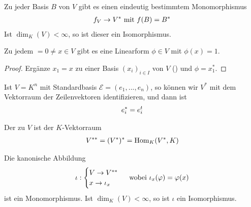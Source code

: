 \begin{conclusion}
	Zu jeder Basis $B$ von $V$ gibt es einen eindeutig bestimmtem Monomorphismus
	\begin{align}
		f_V\to V^*\text{ mit } f(B)=B^*\notag
	\end{align}
	Ist $\dim_K(V)<\infty$, so ist dieser ein Isomorphismus.
\end{conclusion}

\begin{conclusion}
	Zu jedem $=0\neq x\in V$ gibt es eine Linearform $\phi\in V$ mit $\phi(x)=1$.
\end{conclusion}
\begin{proof}
	Ergänze $x_1=x$ zu einer Basis $(x_i)_{i\in I}$ von $V$ () und $\phi=x_1^*$.
\end{proof}

\begin{example}
	Ist $V=K^n$ mit Standardbasis $\mathcal{E}=(e_1,...,e_n)$, so können wir $V^*$ mit dem Vektorraum der Zeilenvektoren identifizieren, und dann ist
	\begin{align}
		e_i^* = e_i^t\notag
	\end{align}
\end{example}

\begin{definition}[Bidualraum]
	Der  zu $V$ ist der $K$-Vektorraum
	\begin{align}
		V^{**}=(V^*)^*=\Hom_K(V^*,K)\notag
	\end{align}
\end{definition}

\begin{proposition}
	Die kanonische Abbildung
	\begin{align}
		\iota:\begin{cases}
		V\to V^{**} \\ x\to \iota_x
		\end{cases}\text{ wobei } \iota_x(\phi)=\phi(x)\notag
	\end{align}
	ist ein Monomorphismus. Ist $\dim_K(V)<\infty$, so ist $\iota$ ein Isomorphismus.
\end{proposition}